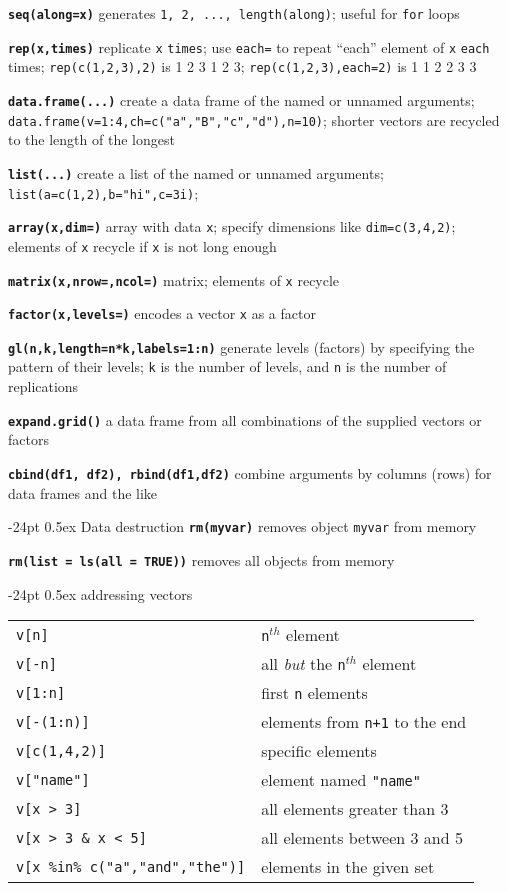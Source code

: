 \documentclass[8pt,landscape]{article}
\makeatletter
\renewcommand\section{\@startsection{section}{1}{0mm}%
                                     {-24pt}%
                                     {0.5ex}%
                                {\color{blue}\normalfont\large\bfseries}}
\newcommand{\code}{\texttt}
\newcommand{\bcode}[1]{\texttt{\textbf{#1}}}
\makeatother
\begin{document}
\begin{multicols*}{3}
\bcode{seq(along=x)} generates \code{1, 2, ..., length(along)}; useful for
\code{for} loops

\bcode{rep(x,times)} replicate \code{x} \code{times}; use \code{each=}
to repeat ``each'' element of \code{x} \code{each} times;
\code{rep(c(1,2,3),2)} is 1 2 3 1 2 3; \code{rep(c(1,2,3),each=2)} is 1 1 2 2 3 3 

\bcode{data.frame(...)} create a data frame of the named or unnamed arguments;
  \code{data.frame(v=1:4,ch=c("a","B","c","d"),n=10)}; shorter vectors
  are recycled to the length of the longest 

\bcode{list(...)} create a list of the named or unnamed arguments;
  \code{list(a=c(1,2),b="hi",c=3i)}; 

\bcode{array(x,dim=)} array with data \code{x}; specify
dimensions like \code{dim=c(3,4,2)}; elements of \code{x} recycle if \code{x}
is not long enough

\bcode{matrix(x,nrow=,ncol=)} matrix; elements of \code{x} recycle

\bcode{factor(x,levels=)} encodes a vector \code{x} as a factor

\bcode{gl(n,k,length=n*k,labels=1:n)} generate levels (factors) by specifying
the pattern of their levels; \code{k} is the number of levels, and \code{n} is the
number of replications

\bcode{expand.grid()} a data frame from all combinations of the supplied vectors
     or factors

\bcode{cbind(df1, df2), rbind(df1,df2)} combine arguments by columns (rows) for data frames and the like



\section{Data destruction}
\bcode{rm(myvar)} removes object \code{myvar} from memory

\bcode{rm(list = ls(all = TRUE))} removes all objects from memory

\section{addressing vectors}

\begin{tabular}{@{}l@{\ }l}
\code{v[n]} & \code{n}$^{th}$ element\\
\code{v[-n]} & all \emph{but} the \code{n}$^{th}$ element\\
\code{v[1:n]} & first \code{n} elements\\
\code{v[-(1:n)]} & elements from \code{n+1} to the end\\
\code{v[c(1,4,2)]} & specific elements\\
\code{v["name"]} & element named \code{"name"}\\
\code{v[x > 3]} & all elements greater than 3\\
\code{v[x > 3 \& x < 5]} & all elements between 3 and 5\\
\code{v[x \%in\% c("a","and","the")]} & elements in the given set\\
\end{tabular}


\end{multicols*}
\end{document}
